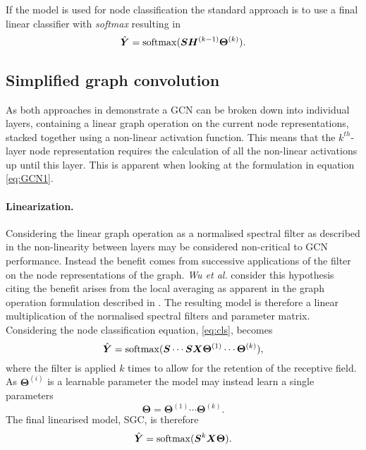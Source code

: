 If the model is used for node classification the standard approach is to use a final linear classifier with \emph{softmax} resulting in 
\begin{equation}
    \label{eq:cls}
    \hat{{\bm{Y}}} = \operatorname{softmax}({\bm{S}}{\bm{H}}^{(k-1)}\bm{\Theta}^{(k)}).
\end{equation}

\subsection{Simplified graph convolution}
\label{sec:SGC}



As both approaches in  demonstrate a GCN can be broken down into individual layers, containing a linear graph operation on the current node representations, stacked together using a non-linear activation function.
This means that the $k^{th}$-layer node representation requires the calculation of all the non-linear activations up until this layer.
This is apparent when looking at the formulation in equation \ref{eq:GCN1}.

\paragraph{Linearization.}
Considering the linear graph operation as a normalised spectral filter as described in  the non-linearity between layers may be considered non-critical to GCN performance.
Instead the benefit comes from successive applications of the filter on the node representations of the graph.
\textit{Wu et al.}\cite{wu2019simplifying} consider this hypothesis citing the benefit arises from the local averaging as apparent in the graph operation formulation described in .
The resulting model is therefore a linear multiplication of the normalised spectral filters and parameter matrix.
Considering the node classification equation, \ref{eq:cls}, becomes
\begin{equation}
    \hat{{\bm{Y}}} = \operatorname{softmax}({\bm{S}}\cdots{\bm{S}}{\bm{X}}\bm{\Theta}^{(1)}\cdots\bm{\Theta}^{(k)}),
\end{equation}
where the filter is applied $k$ times to allow for the retention of the receptive field.
As $\bm{\Theta}^{(i)}$ is a learnable parameter the model may instead learn a single parameters
\begin{equation}
    \label{eq:theta}
    \bm{\Theta} = \bm{\Theta}^{(1)}\cdots\bm{\Theta}^{(k)}.
\end{equation}
The final linearised model, SGC, is therefore
\begin{equation}
    \label{eq:SGC}
    \hat{{\bm{Y}}} = \operatorname{softmax}({\bm{S}}^{k}{\bm{X}}\bm{\Theta}).
\end{equation}


